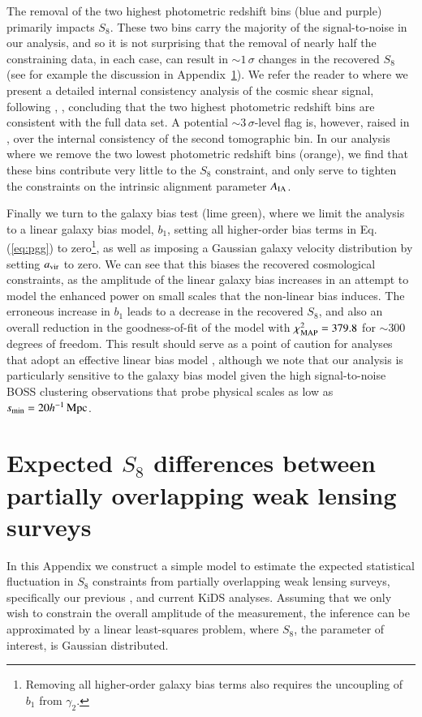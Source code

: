\begin{appendix}
The removal of the two highest photometric redshift bins (blue and purple) primarily impacts $S_8$.   
These two bins carry the majority of the signal-to-noise in our analysis, and so it is not surprising that the removal of nearly half the constraining data, in each case, can result in $\sim\! 1\,\sigma$ changes in the recovered $S_8$ (see for example the discussion in Appendix~\ref{app:expectedoffsets}).   
We refer the reader to \citet{asgari/etal:inprep} where we present a detailed internal consistency analysis of the cosmic shear signal, following \citet{kohlinger/etal:2019}, \citep[see also][]{efstathiou/lemos:2018},  concluding that the two highest photometric redshift bins are consistent with the full data set.   
A potential $\sim\! 3\,\sigma$-level flag is, however, raised in \citet{asgari/etal:inprep}, 
over the internal consistency of the second tomographic bin.  
In our analysis where we remove the two lowest photometric redshift bins (orange), we find that these bins contribute very little to the $S_8$ constraint, and only serve to tighten the constraints on the intrinsic alignment parameter $A_{\rm IA}$.

Finally we turn to the galaxy bias test (lime green), where we limit the analysis to a linear galaxy bias model, $b_1$, setting all higher-order bias terms in Eq. (\ref{eq:pgg}) to zero\footnote{Removing all higher-order galaxy bias terms also requires the uncoupling of $b_1$ from $\gamma_2$.}, as well as imposing a Gaussian galaxy velocity distribution by setting $a_{\rm vir}$ to zero.   
We can see that this biases the recovered cosmological constraints, as the amplitude of the linear galaxy bias increases in an attempt to model the enhanced power on small scales that the non-linear bias induces.   
The erroneous increase in $b_1$ leads to a decrease in the recovered $S_8$, and also an overall reduction in the goodness-of-fit of the model with $\chi^2_{\rm MAP} = 379.8$ for $\sim\! 300$ degrees of freedom.  This result should serve as a point of caution for \tttp analyses that adopt an effective linear bias model \citep[see also the discussion in][]{asgari/etal:2020}, although we note that our analysis is particularly sensitive to the galaxy bias model given the high signal-to-noise BOSS clustering observations that probe physical scales as low as $s_{\rm min}= 20 h^{-1}\, {\rm Mpc}$.

\section{Expected $S_8$ differences between partially overlapping weak lensing surveys}
\label{app:expectedoffsets}
In this Appendix we construct a simple model to estimate the expected statistical fluctuation in $S_8$ constraints from partially overlapping weak lensing surveys, specifically our previous \citep[KV450,][]{wright/etal:2020b}, and current KiDS analyses.   Assuming that we only wish to constrain the overall amplitude of the measurement, the inference can be approximated by a linear least-squares problem, where $S_{8}$, the parameter of interest, is Gaussian distributed. 


\end{appendix}
